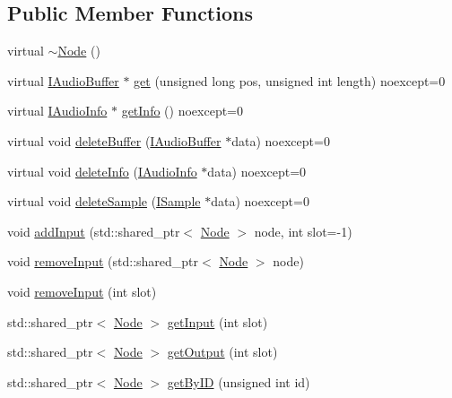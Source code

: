 \subsection*{Public Member Functions}
\begin{DoxyCompactItemize}
\item 
virtual \hyperlink{classmaudio_1_1Node_aac4476ebe448f6a52e43b049484c3758}{$\sim$\-Node} ()
\item 
virtual \hyperlink{classmaudio_1_1IAudioBuffer}{I\-Audio\-Buffer} $\ast$ \hyperlink{classmaudio_1_1Node_a19514a2d372ace1179e2b910b13ee26c}{get} (unsigned long pos, unsigned int length) noexcept=0
\item 
virtual \hyperlink{classmaudio_1_1IAudioInfo}{I\-Audio\-Info} $\ast$ \hyperlink{classmaudio_1_1Node_a7e8a3c69d7d49328dba7f0ab004a6bd4}{get\-Info} () noexcept=0
\item 
virtual void \hyperlink{classmaudio_1_1Node_a11f8c628cc1d1994ad45e9ea81d5e27c}{delete\-Buffer} (\hyperlink{classmaudio_1_1IAudioBuffer}{I\-Audio\-Buffer} $\ast$data) noexcept=0
\item 
virtual void \hyperlink{classmaudio_1_1Node_af9a851c3aa51799a416f4a42acb15617}{delete\-Info} (\hyperlink{classmaudio_1_1IAudioInfo}{I\-Audio\-Info} $\ast$data) noexcept=0
\item 
virtual void \hyperlink{classmaudio_1_1Node_a4a6a5d0dc79d3bee44d3284517bdfe2b}{delete\-Sample} (\hyperlink{classmaudio_1_1ISample}{I\-Sample} $\ast$data) noexcept=0
\item 
void \hyperlink{classmaudio_1_1Node_aa989f49d7ee91c9b6889a2f75e443273}{add\-Input} (std\-::shared\-\_\-ptr$<$ \hyperlink{classmaudio_1_1Node}{Node} $>$ node, int slot=-\/1)
\item 
void \hyperlink{classmaudio_1_1Node_aafffc41b14d93b275c4945966a032cba}{remove\-Input} (std\-::shared\-\_\-ptr$<$ \hyperlink{classmaudio_1_1Node}{Node} $>$ node)
\item 
void \hyperlink{classmaudio_1_1Node_abcf1492e0e46096af20040081c9e4b45}{remove\-Input} (int slot)
\item 
std\-::shared\-\_\-ptr$<$ \hyperlink{classmaudio_1_1Node}{Node} $>$ \hyperlink{classmaudio_1_1Node_a9dd19525ec456748a58bfd13be6de386}{get\-Input} (int slot)
\item 
std\-::shared\-\_\-ptr$<$ \hyperlink{classmaudio_1_1Node}{Node} $>$ \hyperlink{classmaudio_1_1Node_abdf6a8a71127b38d8f8a2f5bd3fda3d3}{get\-Output} (int slot)
\item 
std\-::shared\-\_\-ptr$<$ \hyperlink{classmaudio_1_1Node}{Node} $>$ \hyperlink{classmaudio_1_1Node_a63bc55e437f828250b4bdd86862d3da1}{get\-By\-I\-D} (unsigned int id)

\end{DoxyCompactItemize}
